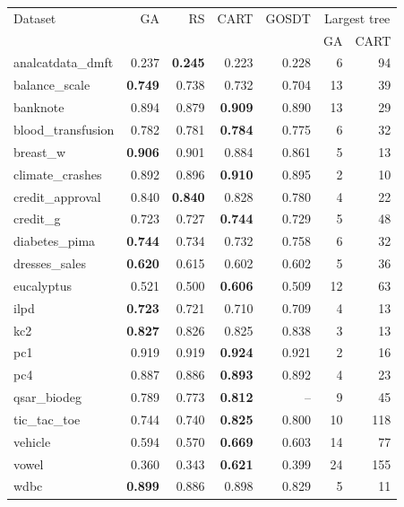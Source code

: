 \begin{tabular}{lrrrrrr}
\toprule
Dataset & GA & RS & CART & GOSDT & \multicolumn{2}{c}{Largest tree} \\
 &  &  &  &  & GA & CART \\
\midrule
analcatdata\_dmft & 0.237 & \textbf{0.245} & 0.223 & 0.228 & 6 & 94 \\
balance\_scale & \textbf{0.749} & 0.738 & 0.732 & 0.704 & 13 & 39 \\
banknote & 0.894 & 0.879 & \textbf{0.909} & 0.890 & 13 & 29 \\
blood\_transfusion & 0.782 & 0.781 & \textbf{0.784} & 0.775 & 6 & 32 \\
breast\_w & \textbf{0.906} & 0.901 & 0.884 & 0.861 & 5 & 13 \\
climate\_crashes & 0.892 & 0.896 & \textbf{0.910} & 0.895 & 2 & 10 \\
credit\_approval & 0.840 & \textbf{0.840} & 0.828 & 0.780 & 4 & 22 \\
credit\_g & 0.723 & 0.727 & \textbf{0.744} & 0.729 & 5 & 48 \\
diabetes\_pima & \textbf{0.744} & 0.734 & 0.732 & 0.758 & 6 & 32 \\
dresses\_sales & \textbf{0.620} & 0.615 & 0.602 & 0.602 & 5 & 36 \\
eucalyptus & 0.521 & 0.500 & \textbf{0.606} & 0.509 & 12 & 63 \\
ilpd & \textbf{0.723} & 0.721 & 0.710 & 0.709 & 4 & 13 \\
kc2 & \textbf{0.827} & 0.826 & 0.825 & 0.838 & 3 & 13 \\
pc1 & 0.919 & 0.919 & \textbf{0.924} & 0.921 & 2 & 16 \\
pc4 & 0.887 & 0.886 & \textbf{0.893} & 0.892 & 4 & 23 \\
qsar\_biodeg & 0.789 & 0.773 & \textbf{0.812} & -- & 9 & 45 \\
tic\_tac\_toe & 0.744 & 0.740 & \textbf{0.825} & 0.800 & 10 & 118 \\
vehicle & 0.594 & 0.570 & \textbf{0.669} & 0.603 & 14 & 77 \\
vowel & 0.360 & 0.343 & \textbf{0.621} & 0.399 & 24 & 155 \\
wdbc & \textbf{0.899} & 0.886 & 0.898 & 0.829 & 5 & 11 \\
\bottomrule
\end{tabular}
